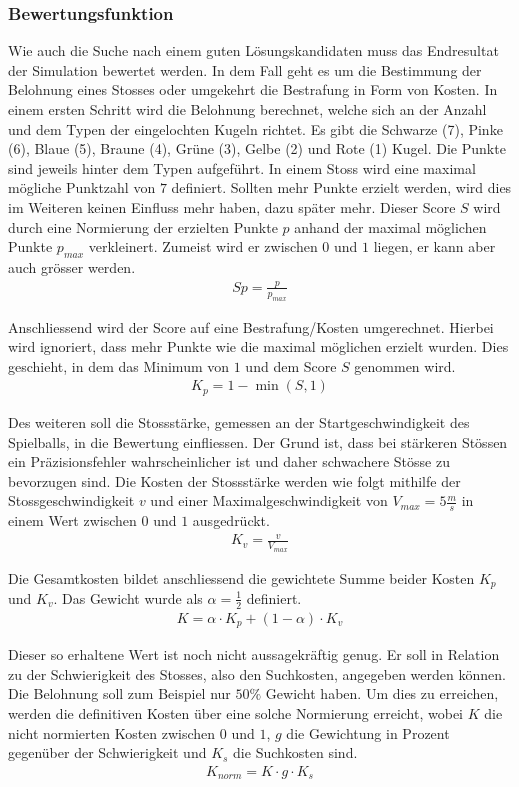 \subsubsection{Bewertungsfunktion}
Wie auch die Suche nach einem guten Lösungskandidaten muss das Endresultat der Simulation bewertet werden.
In dem Fall geht es um die Bestimmung der Belohnung eines Stosses oder umgekehrt die Bestrafung in Form von Kosten.
In einem ersten Schritt wird die Belohnung berechnet, welche sich an der Anzahl und dem Typen der eingelochten Kugeln richtet.
Es gibt die Schwarze (7), Pinke (6), Blaue (5), Braune (4), Grüne (3), Gelbe (2) und Rote (1) Kugel.
Die Punkte sind jeweils hinter dem Typen aufgeführt.
In einem Stoss wird eine maximal mögliche Punktzahl von $7$ definiert.
Sollten mehr Punkte erzielt werden, wird dies im Weiteren keinen Einfluss mehr haben, dazu später mehr.
Dieser Score $S$ wird durch eine Normierung der erzielten Punkte $p$ anhand der
maximal möglichen Punkte $p_{max}$ verkleinert. Zumeist wird er zwischen $0$ und $1$ liegen, er kann aber auch grösser werden.
\begin{align}
    S{p} = \frac{p}{p_{max}}
\end{align}

Anschliessend wird der Score auf eine Bestrafung/Kosten umgerechnet. Hierbei wird ignoriert, dass mehr Punkte wie die maximal
möglichen erzielt wurden. Dies geschieht, in dem das Minimum von $1$ und dem Score $S$ genommen wird.
\begin{align}
    K_{p} = 1 - \min{(S, 1)}
\end{align}

Des weiteren soll die Stossstärke, gemessen an der Startgeschwindigkeit des Spielballs, in die Bewertung einfliessen.
Der Grund ist, dass bei stärkeren Stössen ein Präzisionsfehler wahrscheinlicher ist und daher schwachere Stösse zu bevorzugen sind.
Die Kosten der Stossstärke werden wie folgt mithilfe der Stossgeschwindigkeit $v$ und einer
Maximalgeschwindigkeit von $V_{max} = 5\frac{m}{s}$ in einem Wert zwischen $0$ und $1$ ausgedrückt.
\begin{align}
    K_{v} = \frac{v}{V_{max}}
\end{align}

Die Gesamtkosten bildet anschliessend die gewichtete Summe beider Kosten $K_p$ und $K_v$.
Das Gewicht wurde als $\alpha = \frac{1}{2}$ definiert.
\begin{align}
    K = \alpha \cdot K_p + (1 - \alpha) \cdot K_v
\end{align}

Dieser so erhaltene Wert ist noch nicht aussagekräftig genug.
Er soll in Relation zu der Schwierigkeit des Stosses, also den Suchkosten, angegeben werden können.
Die Belohnung soll zum Beispiel nur $50 \%$ Gewicht haben.
Um dies zu erreichen, werden die definitiven Kosten über eine solche Normierung erreicht,
wobei $K$ die nicht normierten Kosten zwischen $0$ und
$1$, $g$ die Gewichtung in Prozent gegenüber der Schwierigkeit und $K_{s}$ die Suchkosten sind.
\begin{align}
    K_{norm} = K \cdot g \cdot K_{s}
\end{align}
